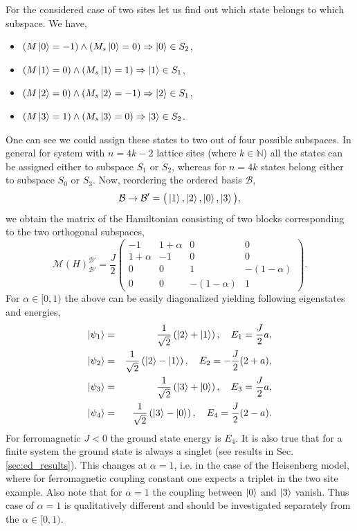 \documentclass[12pt, a4paper]{article}
\begin{document}
For the considered case of two sites let us find out which state belongs to which subspace. We have,
\begin{itemize}
	\item $(M\ket{0} = -1) \land (M_s\ket{0} = 0) \Rightarrow \ket{0} \in S_2$, 
	\item $(M\ket{1} = 0) \land (M_s\ket{1} = 1) \Rightarrow \ket{1} \in S_1$, 
	\item $(M\ket{2} = 0) \land (M_s\ket{2} = -1) \Rightarrow \ket{2} \in S_1$, 
	\item $(M\ket{3} = 1) \land (M_s\ket{3} = 0) \Rightarrow \ket{3} \in S_2$.
\end{itemize}
One can see we could assign these states to two out of four possible subspaces. In general for system with $n = 4k - 2$ lattice sites (where $k \in \mathbb{N}$) all the states can be assigned either to subspace $S_1$ or $S_2$, whereas for $n = 4k$ states belong either to subspace $S_0$ or $S_3$. Now, reordering the ordered basis $\mathcal{B}$,
\begin{equation}
\mathcal{B} \rightarrow \mathcal{B}' = \big(\ket{1}, \ket{2}, \ket{0}, \ket{3}\big),
\end{equation}
we obtain the matrix of the Hamiltonian consisting of two blocks corresponding to the two orthogonal subspaces,
\begin{equation}
\mathcal{M}(H)_{\mathcal{B}'}^{\mathcal{B}'} = \frac{J}{2} \begin{pmatrix}
-1 & 1+\alpha & 0 & 0 \\
1+\alpha & -1 & 0 & 0 \\
0 & 0 & 1 & -(1-\alpha) \\
0 & 0 & -(1-\alpha) & 1
\end{pmatrix}.
\end{equation}
For $\alpha \in [0, 1)$ the above can be easily diagonalized yielding following eigenstates and energies,
\begin{eqnarray}
\ket{\psi_1} &=& \frac{1}{\sqrt{2}}\left(\ket{2} + \ket{1}\right), \quad E_1 = \frac{J}{2}a, \\
\ket{\psi_2} &=& \frac{1}{\sqrt{2}}\left(\ket{2} - \ket{1}\right), \quad E_2 = -\frac{J}{2}(2+a), \\
\ket{\psi_3} &=& \frac{1}{\sqrt{2}}\left(\ket{3} + \ket{0}\right), \quad E_3 = \frac{J}{2}a, \\
\ket{\psi_4} &=& \frac{1}{\sqrt{2}}\left(\ket{3} - \ket{0}\right), \quad E_4 = \frac{J}{2}(2-a).
\end{eqnarray}
For ferromagnetic $J < 0$ the ground state energy is $E_4$. It is also true that for a finite system the ground state is always a singlet (see results in Sec. \ref{sec:ed_results}). This changes at $\alpha = 1$, i.e. in the case of the Heisenberg model, where for ferromagnetic coupling constant one expects a triplet in the two site example. Also note that for $\alpha = 1$ the coupling between $\ket{0}$ and $\ket{3}$ vanish. Thus case of $\alpha = 1$ is qualitatively different and should be investigated separately from the $\alpha \in [0, 1)$. 
\end{document}
